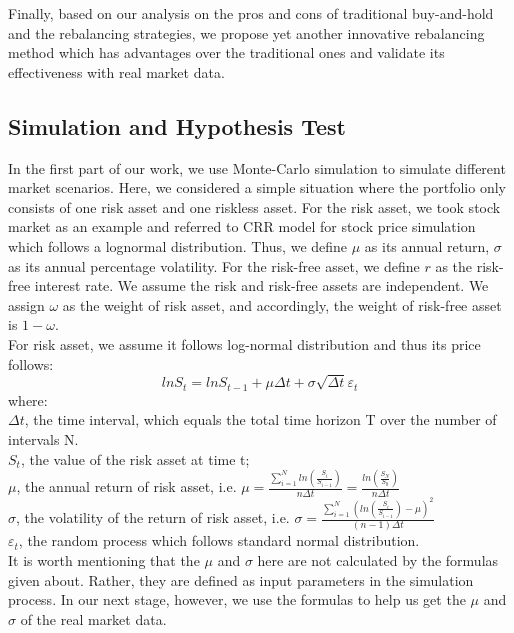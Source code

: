 \documentclass[
10pt, %
a4paper, %
oneside, %
headinclude,footinclude, %
BCOR5mm, %
]{scrartcl}
\begin{document}
Finally, based on our analysis on the pros and cons of traditional buy-and-hold and the rebalancing strategies, we propose yet another innovative rebalancing method which has advantages over the traditional ones and validate its effectiveness with real market data.\\
\subsection{Simulation and Hypothesis Test}
In the first part of our work, we use Monte-Carlo simulation to simulate different market scenarios. Here, we considered a simple situation where the portfolio only consists of one risk asset and one riskless asset. For the risk asset, we took stock market as an example and referred to CRR model for stock price simulation which follows a lognormal distribution. Thus, we define $\mu$ as its annual return, $\sigma$ as its annual percentage volatility. For the risk-free asset, we define $r$ as the risk-free interest rate. We assume the risk and risk-free assets are independent. We assign $\omega$ as the weight of risk asset, and accordingly, the weight of risk-free asset is $1-\omega$. \\

For risk asset, we assume it follows log-normal distribution and thus its price follows:
$$lnS_{t} = lnS_{t-1} + \mu\Delta t + \sigma\sqrt{\Delta t}\varepsilon_{t} $$
where:\\

$\Delta t$, the time interval, which equals the total time horizon T over the number of intervals N.\\

$S_t$, the value of the risk asset at time t; \\

$\mu$, the annual return of risk asset, i.e. $\mu = \frac{\sum_{i=1}^{N}ln(\frac{S_i}{S_{i-1}})}{n\Delta t} = \frac{ ln(\frac{S_N}{S_0}) }{n\Delta t}$ \\

$\sigma$, the volatility of the return of risk asset, i.e. $\sigma = \frac{ \sum_{i=1}^{N} ( ln(\frac{S_i}{S_{i-1}}) - \mu  )^2   }{(n-1)\Delta t}$ \\

$\varepsilon_t$, the random process which follows standard normal distribution. \\

It is worth mentioning that the $\mu$ and $\sigma$ here are not calculated by the formulas given about. Rather, they are defined as input parameters in the simulation process. In our next stage, however, we use the formulas to help us get the $\mu$ and $\sigma$ of the real market data. \\
\end{document}
